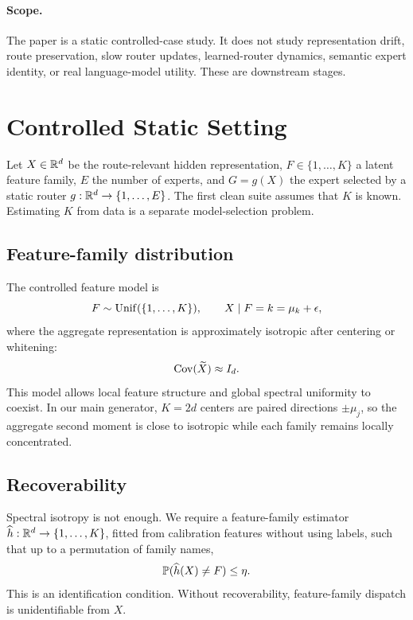 \documentclass{article}
\begin{document}
\paragraph{Scope.}
The paper is a static controlled-case study.  It does not study representation
drift, route preservation, slow router updates, learned-router dynamics, semantic
expert identity, or real language-model utility.  These are downstream stages.

\section{Controlled Static Setting}

Let \(X\in\mathbb{R}^d\) be the route-relevant hidden representation, \(F\in
\{1,\ldots,K\}\) a latent feature family, \(E\) the number of experts, and
\(G=g(X)\) the expert selected by a static router \(g:\mathbb{R}^d\to\{1,\ldots,E\}\).
The first clean suite assumes that \(K\) is known.  Estimating \(K\) from data is
a separate model-selection problem.

\subsection{Feature-family distribution}

The controlled feature model is
\begin{equation}
    F\sim\mathrm{Unif}(\{1,\ldots,K\}),\qquad
    X\mid F=k=\mu_k+\epsilon,
    \label{eq:mixture}
\end{equation}
where the aggregate representation is approximately isotropic after centering or
whitening:
\begin{equation}
    \mathrm{Cov}(\widetilde X)\approx I_d.
    \label{eq:isotropy}
\end{equation}
This model allows local feature structure and global spectral uniformity to
coexist.  In our main generator, \(K=2d\) centers are paired directions
\(\pm\mu_j\), so the aggregate second moment is close to isotropic while each
family remains locally concentrated.

\subsection{Recoverability}

Spectral isotropy is not enough.  We require a feature-family estimator
\(\widehat h:\mathbb{R}^d\to\{1,\ldots,K\}\), fitted from calibration features without
using labels, such that up to a permutation of family names,
\begin{equation}
    \mathbb{P}(\widehat h(X)\neq F)\leq\eta.
    \label{eq:recovery}
\end{equation}
This is an identification condition.  Without recoverability, feature-family
dispatch is unidentifiable from \(X\).
\end{document}

